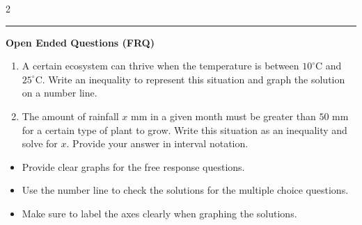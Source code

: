 \documentclass[10pt]{article}
\begin{document}
\begin{multicols}{2}
\begin{enumerate}[label=\textbf{Q\arabic*.}, leftmargin=*, itemsep=6pt, parsep=0pt]
\end{enumerate}
\end{multicols}

\vspace{-0.2cm}
\hrule
\vspace{0.2cm}
\textbf{\small Open Ended Questions (FRQ)}
\begin{enumerate}[label=\textbf{Q\arabic*.}, start=9, itemsep=5pt, topsep=0pt]

  \item \small A certain ecosystem can thrive when the temperature is between $10^\circ$C and $25^\circ$C. Write an inequality to represent this situation and graph the solution on a number line. \vspace{2cm}

  \item \small The amount of rainfall $x$ mm in a given month must be greater than $50$ mm for a certain type of plant to grow. Write this situation as an inequality and solve for $x$. Provide your answer in interval notation. \vspace{2cm}

\end{enumerate}

\vfill

\begin{tcolorbox}[colback=blue!5, colframe=mainblue!50, title=\small \textbf{Chef's Tips}, fonttitle=\bfseries, bottom=1mm]
\begin{itemize}[noitemsep, topsep=2pt, leftmargin=0.5cm]
  \item \scriptsize Provide clear graphs for the free response questions.\item \scriptsize Use the number line to check the solutions for the multiple choice questions.\item \scriptsize Make sure to label the axes clearly when graphing the solutions.
\end{itemize}
\end{tcolorbox}
\end{document}
